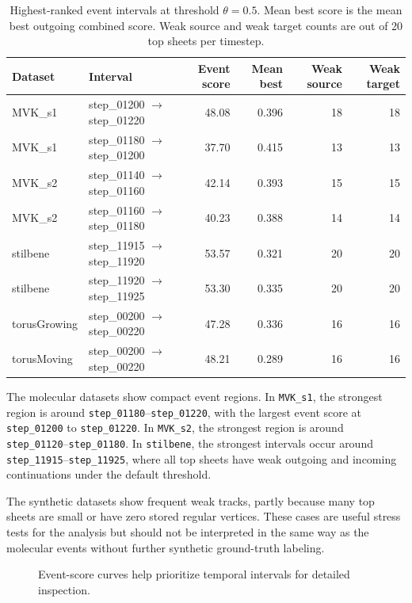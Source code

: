 \begin{table}[t]
\caption{Highest-ranked event intervals at threshold \(\theta=0.5\). Mean best
score is the mean best outgoing combined score. Weak source and weak target
counts are out of 20 top sheets per timestep.}
\label{tab:event-intervals}
\centering
\begin{tabular}{llrrrr}
\toprule
Dataset & Interval & Event score & Mean best & Weak source & Weak target \\
\midrule
MVK\_s1 & step\_01200 $\rightarrow$ step\_01220 & 48.08 & 0.396 & 18 & 18 \\
MVK\_s1 & step\_01180 $\rightarrow$ step\_01200 & 37.70 & 0.415 & 13 & 13 \\
MVK\_s2 & step\_01140 $\rightarrow$ step\_01160 & 42.14 & 0.393 & 15 & 15 \\
MVK\_s2 & step\_01160 $\rightarrow$ step\_01180 & 40.23 & 0.388 & 14 & 14 \\
stilbene & step\_11915 $\rightarrow$ step\_11920 & 53.57 & 0.321 & 20 & 20 \\
stilbene & step\_11920 $\rightarrow$ step\_11925 & 53.30 & 0.335 & 20 & 20 \\
torusGrowing & step\_00200 $\rightarrow$ step\_00220 & 47.28 & 0.336 & 16 & 16 \\
torusMoving & step\_00200 $\rightarrow$ step\_00220 & 48.21 & 0.289 & 16 & 16 \\
\bottomrule
\end{tabular}
\end{table}

The molecular datasets show compact event regions. In \texttt{MVK\_s1}, the
strongest region is around \texttt{step\_01180}--\texttt{step\_01220}, with the
largest event score at \texttt{step\_01200} to \texttt{step\_01220}. In
\texttt{MVK\_s2}, the strongest region is around
\texttt{step\_01120}--\texttt{step\_01180}. In \texttt{stilbene}, the strongest
intervals occur around \texttt{step\_11915}--\texttt{step\_11925}, where all
top sheets have weak outgoing and incoming continuations under the default
threshold.

The synthetic datasets show frequent weak tracks, partly because many top
sheets are small or have zero stored regular vertices. These cases are useful
stress tests for the analysis but should not be interpreted in the same way as
the molecular events without further synthetic ground-truth labeling.

\begin{figure}[t]
  \caption{Event-score curves help prioritize temporal intervals for detailed
  inspection.}
  \label{fig:event-curves}
\end{figure}

